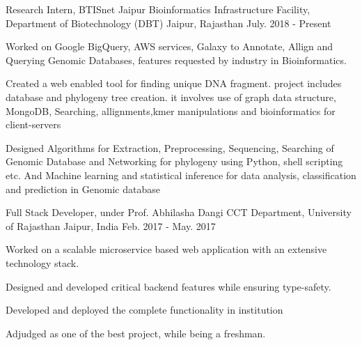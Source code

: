 
\vspace{-0.2cm}


\begin{cventries}


  \cventry
  {Research Intern, BTISnet Jaipur}
  {Bioinformatics Infrastructure Facility, Department of Biotechnology (DBT)}
  {Jaipur, Rajasthan}
  {July. 2018 - Present}
  {
    \begin{cvitems}
    \item {Worked on Google BigQuery, AWS services, Galaxy to Annotate, Allign and Querying Genomic Databases, features requested by industry in Bioinformatics.}
    \item {Created a web enabled tool for finding unique DNA fragment. project includes database and phylogeny tree creation. it involves use of graph data structure, MongoDB, Searching, allignments,kmer manipulations and bioinformatics for client-servers }
    \item {Designed Algorithms for Extraction, Preprocessing, Sequencing, Searching of Genomic Database and Networking for phylogeny using Python, shell scripting etc. And Machine learning and statistical inference for data analysis, classification and prediction in Genomic database}
    \end{cvitems}
  }


  \cventry
  {Full Stack Developer, under Prof. Abhilasha Dangi}
  {CCT Department, University of Rajasthan}
  {Jaipur, India}
  {Feb. 2017 - May. 2017}
  {
    \begin{cvitems}
    \item Worked on a scalable microservice based web application with an extensive technology stack.
    \item Designed and developed critical backend features while
      ensuring type-safety.
    \item Developed and deployed the complete functionality in institution
    \item Adjudged as one of the best project, while being a freshman.
    \end{cvitems}
  }

\end{cventries}

